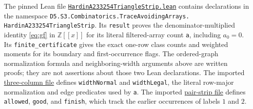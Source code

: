 \documentclass[11pt]{article}
\begin{document}
The pinned Lean file
\href{https://github.com/the-omega-institute/trureturing/blob/81ea1b50693b21a1d6370aa3e18815afe5f96af2/D5/S3/Combinatorics/TraceAvoidingArrays/HardinA233254TriangleStrip.lean}{\texttt{HardinA233254TriangleStrip.lean}}
contains declarations in the namespace
\texttt{D5.S3.Combinatorics.TraceAvoidingArrays.}\allowbreak
\texttt{HardinA233254TriangleStrip}.
Its \texttt{result} proves the denominator-multiplied identity
\eqref{eq:gf} in $\mathbb Z[[x]]$ for its literal filtered-array count
\texttt{a}, including $a_0=0$.
Its \texttt{finite\_certificate} gives the exact one-row class counts and
weighted moments for its boundary and first-occurrence flags.
The ordered-graph normalization formula and neighboring-width arguments
above are written proofs; they are not assertions about those two
Lean declarations.
The imported
\href{https://github.com/the-omega-institute/trureturing/blob/81ea1b50693b21a1d6370aa3e18815afe5f96af2/D5/S3/Combinatorics/TraceAvoidingArrays/HardinA233251TriangleStrip.lean}{three-column file}
defines \texttt{widthNormal} and \texttt{widthLegal}, the literal
row-major normalization and edge predicates used by \texttt{a}.
The imported
\href{https://github.com/the-omega-institute/trureturing/blob/81ea1b50693b21a1d6370aa3e18815afe5f96af2/D5/S3/Combinatorics/TraceAvoidingArrays/HardinA233175PairStrip.lean}{pair-strip file}
defines \texttt{allowed}, \texttt{good}, and \texttt{finish}, which track
the earlier occurrences of labels $1$ and $2$.
\end{document}
